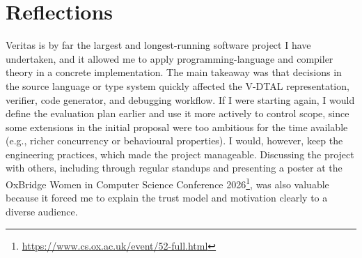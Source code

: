\section{Reflections}
Veritas is by far the largest and longest-running software project I have undertaken, and it allowed me to apply programming-language and compiler theory in a concrete implementation. The main takeaway was that decisions in the source language or type system quickly affected the V-DTAL representation, verifier, code generator, and debugging workflow. If I were starting again, I would define the evaluation plan earlier and use it more actively to control scope, since some extensions in the initial proposal were too ambitious for the time available (e.g., richer concurrency or behavioural properties). I would, however, keep the engineering practices, which made the project manageable. Discussing the project with others, including through regular standups and presenting a poster at the OxBridge Women in Computer Science Conference 2026\footnote{\url{https://www.cs.ox.ac.uk/event/52-full.html}}, was also valuable because it forced me to explain the trust model and motivation clearly to a diverse audience.


%
%
%
